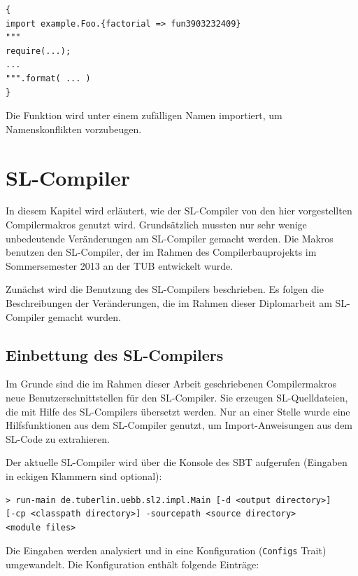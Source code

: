 \documentclass[12pt,bibtotoc]{scrreprt}
\begin{document}
\begin{lstlisting}[caption={Scala \lstinline!import!-Anweisung für eine annotierte Funktion}, label=lst:slci-function-import, float=h]
{
import example.Foo.{factorial => fun3903232409}
"""
require(...);
...
""".format( ... )
}
\end{lstlisting}

Die Funktion wird unter einem zufälligen Namen importiert, um Namenskonflikten vorzubeugen.

\chapter{SL-Compiler}
\label{chap:dom-monad-extensions}

In diesem Kapitel wird erläutert, wie der SL-Compiler von den hier vorgestellten Compilermakros genutzt wird. Grundsätzlich mussten nur sehr wenige unbedeutende Veränderungen am SL-Compiler gemacht werden. Die Makros benutzen den SL-Compiler, der im Rahmen des Compilerbauprojekts im Sommersemester 2013 an der \ac{TUB} entwickelt wurde\cite{Bisping2013}.

Zunächst wird die Benutzung des SL-Compilers beschrieben. Es folgen die Beschreibungen der Veränderungen, die im Rahmen dieser Diplomarbeit am SL-Compiler gemacht wurden.

\section{Einbettung des SL-Compilers}

Im Grunde sind die im Rahmen dieser Arbeit geschriebenen Compilermakros neue Benutzerschnittstellen für den SL-Compiler. Sie erzeugen SL-Quelldateien, die mit Hilfe des SL-Compilers übersetzt werden. Nur an einer Stelle wurde eine Hilfsfunktionen aus dem SL-Compiler genutzt, um Import-Anweisungen aus dem SL-Code zu extrahieren.

Der aktuelle SL-Compiler wird über die Konsole des \ac{SBT} aufgerufen (Eingaben in eckigen Klammern sind optional)\cite{TypeSave}\cite[S. 15f]{Bisping2013}:

\begin{lstlisting}
> run-main de.tuberlin.uebb.sl2.impl.Main [-d <output directory>]
[-cp <classpath directory>] -sourcepath <source directory>
<module files>
\end{lstlisting}

Die Eingaben werden analysiert und in eine Konfiguration (\lstinline!Configs! Trait) umgewandelt. Die Konfiguration enthält folgende Einträge:
\end{document}
